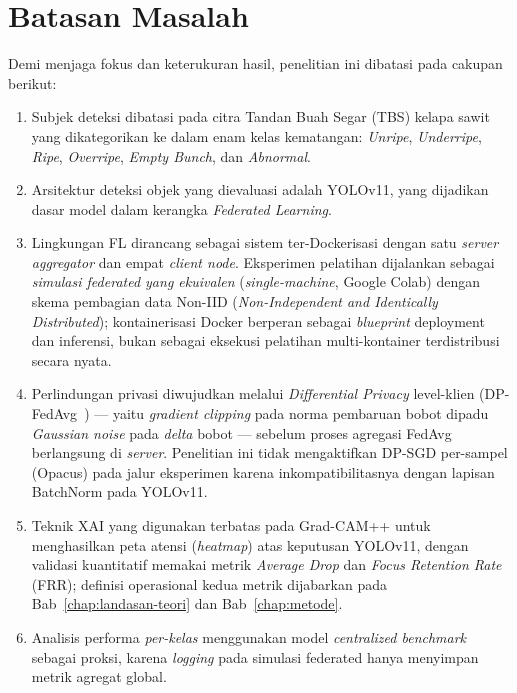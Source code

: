 \section{Batasan Masalah}
\label{sec:batasan-masalah}
Demi menjaga fokus dan keterukuran hasil, penelitian ini dibatasi pada cakupan berikut:
\begin{enumerate}
    \item Subjek deteksi dibatasi pada citra Tandan Buah Segar (TBS) kelapa sawit yang dikategorikan ke dalam enam kelas kematangan: \emph{Unripe}, \emph{Underripe}, \emph{Ripe}, \emph{Overripe}, \emph{Empty Bunch}, dan \emph{Abnormal}.
    \item Arsitektur deteksi objek yang dievaluasi adalah YOLOv11, yang dijadikan dasar model dalam kerangka \emph{Federated Learning}.
    \item Lingkungan FL dirancang sebagai sistem ter-Dockerisasi dengan satu \emph{server aggregator} dan empat \emph{client node}. Eksperimen pelatihan dijalankan sebagai \emph{simulasi federated yang ekuivalen} (\emph{single-machine}, Google Colab) dengan skema pembagian data Non-IID (\emph{Non-Independent and Identically Distributed}); kontainerisasi Docker berperan sebagai \emph{blueprint} deployment dan inferensi, bukan sebagai eksekusi pelatihan multi-kontainer terdistribusi secara nyata.
    \item Perlindungan privasi diwujudkan melalui \emph{Differential Privacy} level-klien (DP-FedAvg~\cite{mcmahan2018learning}) --- yaitu \emph{gradient clipping} pada norma pembaruan bobot dipadu \emph{Gaussian noise} pada \emph{delta} bobot --- sebelum proses agregasi FedAvg berlangsung di \emph{server}. Penelitian ini tidak mengaktifkan DP-SGD per-sampel (Opacus) pada jalur eksperimen karena inkompatibilitasnya dengan lapisan BatchNorm pada YOLOv11.
    \item Teknik XAI yang digunakan terbatas pada Grad-CAM++ untuk menghasilkan peta atensi (\emph{heatmap}) atas keputusan YOLOv11, dengan validasi kuantitatif memakai metrik \emph{Average Drop} dan \emph{Focus Retention Rate} (FRR); definisi operasional kedua metrik dijabarkan pada Bab~\ref{chap:landasan-teori} dan Bab~\ref{chap:metode}.
    \item Analisis performa \emph{per-kelas} menggunakan model \emph{centralized benchmark} sebagai proksi, karena \emph{logging} pada simulasi federated hanya menyimpan metrik agregat global.
\end{enumerate}

